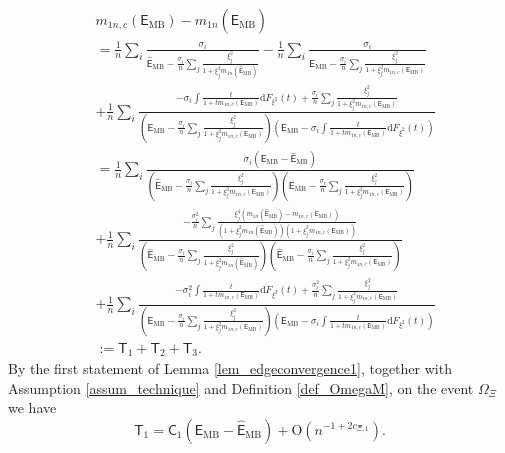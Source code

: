 \documentclass[12pt]{article}
\theoremstyle{plain}
\numberwithin{equation}{section}
\begin{document}
\begin{align}\label{eq_generaldecomposition}
	&m_{1n,c}(\mathsf{E}_{\mathrm{MB}})-m_{1n}(\widehat{\mathsf{E}}_{\mathrm{MB}})\\
	&=\frac{1}{n}\sum_i\frac{\sigma_i}{\widehat{\mathsf{E}}_{\mathrm{MB}}-\frac{\sigma_i}{n}\sum_j\frac{\xi^2_j}{1+\xi^2_jm_{1n}(\widehat{\mathsf{E}}_{\mathrm{MB}})}}-\frac{1}{n}\sum_i\frac{\sigma_i}{\mathsf{E}_{\mathrm{MB}}-\frac{\sigma_i}{n}\sum_j\frac{\xi^2_j}{1+\xi^2_jm_{1n,c}(\mathsf{E}_{\mathrm{MB}})}} \nonumber \\
	&+\frac{1}{n}\sum_i\frac{-\sigma_i\int\frac{t}{1+tm_{1n,c}(\mathsf{E}_{\mathrm{MB}})}\mathrm{d}F_{\xi^2}(t)+\frac{\sigma_i}{n}\sum_j\frac{\xi^2_j}{1+\xi^2_jm_{1n,c}(\mathsf{E}_{\mathrm{MB}})}}{(\mathsf{E}_{\mathrm{MB}}-\frac{\sigma_i}{n}\sum_j\frac{\xi^2_j}{1+\xi^2_jm_{1n,c}(\mathsf{E}_{\mathrm{MB}})})(\mathsf{E}_{\mathrm{MB}}-\sigma_i\int\frac{t}{1+tm_{1n,c}(\mathsf{E}_{\mathrm{MB}})}\mathrm{d}F_{\xi^2}(t))} \nonumber \\
	&=\frac{1}{n}\sum_i\frac{\sigma_i(\mathsf{E}_{\mathrm{MB}}-\widehat{\mathsf{E}}_{\mathrm{MB}})}{(\widehat{\mathsf{E}}_{\mathrm{MB}}-\frac{\sigma_i}{n}\sum_j\frac{\xi^2_j}{1+\xi^2_jm_{1n,c}(\mathsf{E}_{\mathrm{MB}})})(\mathsf{E}_{\mathrm{MB}}-\frac{\sigma_i}{n}\sum_j\frac{\xi^2_j}{1+\xi^2_jm_{1n,c}(\mathsf{E}_{\mathrm{MB}})})} \nonumber \\
	&+\frac{1}{n}\sum_i\frac{-\frac{\sigma_i^2}{n}\sum_j\frac{\xi^4_j(m_{1n}(\widehat{\mathsf{E}}_{\mathrm{MB}})-m_{1n,c}(\mathsf{E}_{\mathrm{MB}}))}{(1+\xi^2_jm_{1n}(\widehat{\mathsf{E}}_{\mathrm{MB}}))(1+\xi^2_jm_{1n,c}(\mathsf{E}_{\mathrm{MB}}))}}{(\widehat{\mathsf{E}}_{\mathrm{MB}}-\frac{\sigma_i}{n}\sum_j\frac{\xi^2_j}{1+\xi^2_jm_{1n}(\widehat{\mathsf{E}}_{\mathrm{MB}})})(\widehat{\mathsf{E}}_{\mathrm{MB}}-\frac{\sigma_i}{n}\sum_j\frac{\xi^2_j}{1+\xi^2_jm_{1n,c}(\mathsf{E}_{\mathrm{MB}})})} \nonumber \\
	&+\frac{1}{n}\sum_i\frac{-\sigma^2_i\int\frac{t}{1+tm_{1n,c}(\mathsf{E}_{\mathrm{MB}})}\mathrm{d}F_{\xi^2}(t)+\frac{\sigma^2_i}{n}\sum_j\frac{\xi^2_j}{1+\xi^2_jm_{1n,c}(\mathsf{E}_{\mathrm{MB}})}}{(\mathsf{E}_{\mathrm{MB}}-\frac{\sigma_i}{n}\sum_j\frac{\xi^2_j}{1+\xi^2_jm_{1n,c}(\mathsf{E}_{\mathrm{MB}})})(\mathsf{E}_{\mathrm{MB}}-\sigma_i\int\frac{t}{1+tm_{1n,c}(\mathsf{E}_{\mathrm{MB}})}\mathrm{d}F_{\xi^2}(t))} \nonumber \\
	&:=\mathsf{T}_1+\mathsf{T}_2+\mathsf{T}_3. 
\end{align}
By the first statement of Lemma \ref{lem_edgeconvergence1}, together with Assumption \ref{assum_technique} and Definition \ref{def_OmegaM}, on the event $\Omega_{\Xi}$ we have
\begin{equation}\label{eq_T1control}
	\mathsf{T}_1=\mathsf{C}_1(\mathsf{E}_{\mathrm{MB}}-\widehat{\mathsf{E}}_{\mathrm{MB}})+\mathrm{O}(n^{-1+2c_{\Xi,1}}).
\end{equation}
\end{document}
